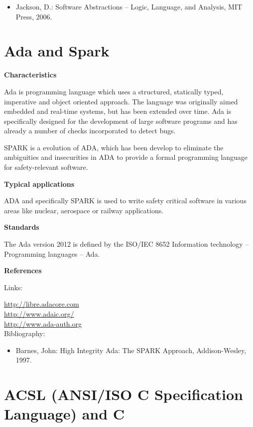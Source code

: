 \documentclass{./template/openetcs_report}
\begin{document}
\begin{itemize}
\item Jackson, D.: Software Abstractions -- Logic, Language, and Analysis, MIT Press, 2006. 
\end{itemize}

\section{Ada and Spark}


	\textbf{Characteristics}

Ada is programming language which uses a structured, statically typed, imperative and object oriented approach. The language was originally aimed embedded and real-time systems, but has been extended over time. Ada is specifically designed for the development of large software programs and has already a number of checks incorporated to detect bugs. 

SPARK is a evolution of ADA, which has been develop to eliminate the ambiguities and insecurities in ADA to provide a formal programming language for safety-relevant software. 

	\textbf{Typical applications}

ADA and specifically SPARK is used to write safety critical software in various areas like nuclear, aerospace or railway applications.

	\textbf{Standards}

The Ada version 2012 is defined by the ISO/IEC 8652 Information technology -- Programming languages -- Ada.

	\textbf{References}

Links:

\url{http://libre.adacore.com} \\[4pt]
\url{http://www.adaic.org/} \\[4pt]
\url{http://www.ada-auth.org} \\[4pt]


Bibliography:

\begin{itemize}
\item Barnes, John: High Integrity Ada: The SPARK Approach, Addison-Wesley, 1997.
\end{itemize} 

\section{ACSL (ANSI/ISO C Specification Language) and C}
\end{document}
